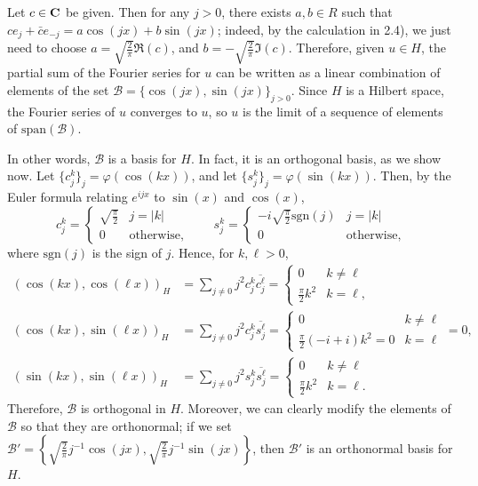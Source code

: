 \documentclass{homework}
\begin{document}
\begin{arabicparts}
		\questionpart
		Let $c \in \textnormal{\bf C}$ be given. Then for any $j > 0$, there exists $a,b \in R$ such that $ce_j + \bar{c}e_{-j} = a\cos(jx) + b\sin(jx)$; indeed, by the calculation in 2.4), we just need to choose $a = \sqrt{\frac{2}{\pi}}\Re(c)$, and $b = -\sqrt{\frac{2}{\pi}}\Im(c)$. Therefore, given $u \in H$, the partial sum of the Fourier series for $u$ can be written as a linear combination of elements of the set $\mathcal{B} = \{\cos(jx),\sin(jx)\}_{j>0}$. Since $H$ is a Hilbert space, the Fourier series of $u$ converges to $u$, so $u$ is the limit of a sequence of elements of $\mathrm{span}(\mathcal{B})$.
		
		In other words, $\mathcal{B}$ is a basis for $H$. In fact, it is an orthogonal basis, as we show now. Let $\{c^k_j\}_j = \varphi(\cos(kx))$, and let $\{s^k_j\}_j = \varphi(\sin(kx))$. Then, by the Euler formula relating $e^{ijx}$ to $\sin(x)$ and $\cos(x)$,
		\begin{equation}
			\label{eq:euler}
			c^k_j = \begin{cases}
				\sqrt{\frac{\pi}{2}} & j = |k| \\
				0 & \text{otherwise},
			\end{cases}\qquad
			s^k_j = \begin{cases}
				-i\sqrt{\frac{\pi}{2}}\mathrm{sgn}(j) & j = |k| \\
				0 & \text{otherwise},
			\end{cases}
		\end{equation}
		where $\mathrm{sgn}(j)$ is the sign of $j$. Hence, for $k, \ell > 0$,
		\begin{align}
			(\cos(kx), \cos(\ell x))_H &= \sum_{j\ne0}j^2c^k_j\overline{c^\ell_j} = \begin{cases}
				0 & k \ne \ell \\
				\frac{\pi}{2}k^2 & k = \ell,
			\end{cases}\\
			(\cos(kx), \sin(\ell x))_H &= \sum_{j\ne0}j^2c^k_j\overline{s^\ell_j} = \begin{cases}
				0 & k\ne \ell \\
				\frac{\pi}{2}\left(-i + i\right)k^2 = 0 & k = \ell
			\end{cases} = 0,\\
			(\sin(kx), \sin(\ell x))_H &= \sum_{j\ne0}j^2s^k_j\overline{s^\ell_j} = \begin{cases}
				0 & k\ne \ell \\
				\frac{\pi}{2}k^2 & k = \ell.
			\end{cases}
		\end{align}
		Therefore, $\mathcal{B}$ is orthogonal in $H$. Moreover, we can clearly modify the elements of $\mathcal{B}$ so that they are orthonormal; if we set $\mathcal{B}' = \left\{\sqrt{\frac{2}{\pi}}j^{-1}\cos(jx), \sqrt{\frac{2}{\pi}}j^{-1}\sin(jx)\right\}$, then $\mathcal{B}'$ is an orthonormal basis for $H$.
		

\end{arabicparts}
\end{document}

